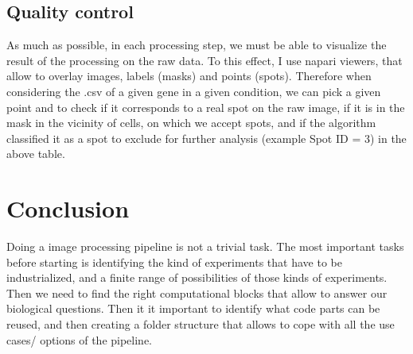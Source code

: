 \documentclass[24pt]{article}
\begin{document}
\subsection{Quality control}

    As much as possible, in each processing step, we must be able to visualize the result of the processing on the raw data.  To this effect, I use napari viewers, that allow to overlay images,  labels (masks) and points (spots). Therefore when considering the .csv of a given gene in a given condition, we can pick a given point and to check if it corresponds to a real spot on the raw image, if it is in the mask in the vicinity of cells, on which we accept spots, and if the algorithm classified it as a spot to exclude for further analysis (example Spot ID = 3) in the above table.


\section{Conclusion}

Doing a image processing pipeline is not a trivial task. The most important tasks before starting is identifying the kind of experiments that have to be industrialized, and a finite range of  possibilities of those kinds of experiments. Then we need to find the right computational blocks that allow to answer our biological questions. Then it it important to identify what code parts can be reused, and then creating a folder structure that allows to cope with all the use cases/ options of the pipeline. 





\end{document}
